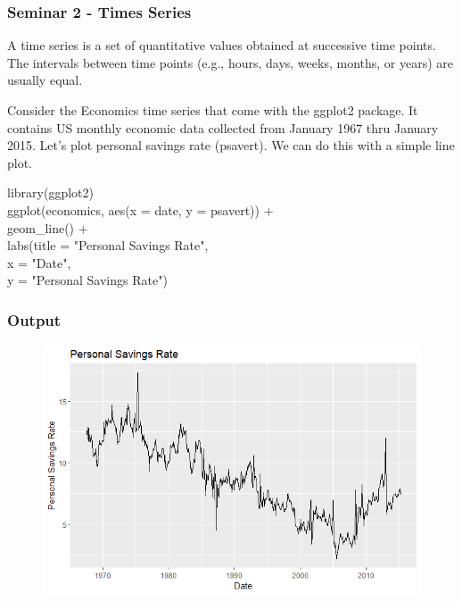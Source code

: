 \documentclass{beamer}
\begin{document}
\begin{frame}
\frametitle{Seminar 2 - Times Series }
A time series is a set of quantitative values obtained at successive time points. The intervals between time points (e.g., hours, days, weeks, months, or years) are usually equal.

Consider the Economics time series that come with the ggplot2 package. It contains US monthly economic data collected from January 1967 thru January 2015. Let’s plot personal savings rate (psavert). We can do this with a simple line plot.

\begin{example} 
library(ggplot2)\\
ggplot(economics, aes(x = date, y = psavert)) +\\
  geom\_line() +\\
  labs(title = "Personal Savings Rate",\\
       x = "Date",\\
       y = "Personal Savings Rate")

\end{example}
\end{frame}
\begin{frame}
\frametitle{Output}
\begin{figure}
\includegraphics[width=1\linewidth]{Seminar_2_images/R/b time series.png}
\end{figure}
\end{frame}
\end{document}
